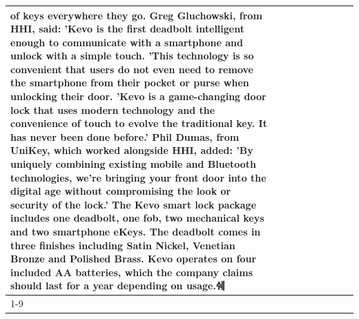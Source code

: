 \begin{table}[H]
\begin{tabular}{lllrlllll}
of keys everywhere they go. Greg Gluchowski, from HHI, said: 'Kevo is the first deadbolt intelligent enough to communicate with a smartphone and unlock with a simple touch. 'This technology is so convenient that users do not even need to remove the smartphone from their pocket or purse when unlocking their door. 'Kevo is a game-changing door lock that uses modern technology and the convenience of touch to evolve the traditional key. It has never been done before.' Phil Dumas, from UniKey, which worked alongside HHI, added: 'By uniquely combining existing mobile and Bluetooth technologies, we’re bringing your front door into the digital age without compromising the look or security of the lock.' The Kevo smart lock package includes one deadbolt, one fob, two mechanical keys and two smartphone eKeys. The deadbolt comes in three finishes including Satin Nickel, Venetian Bronze and Polished Brass. Kevo operates on four included AA batteries, which the company claims should last for a year depending on usage.쉐 \\
\cline{1-9}

\end{tabular}
\end{table}
